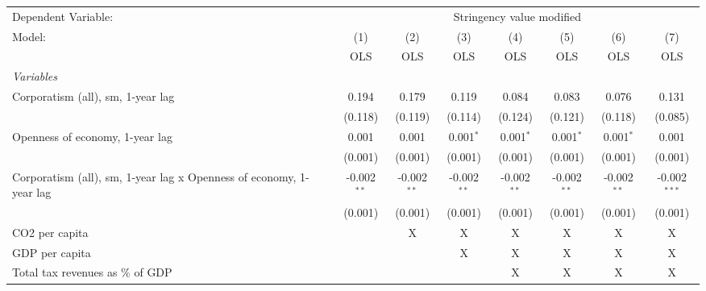 
\begingroup
\centering
\begin{tabular}{lccccccc}
   \toprule
   Dependent Variable: & \multicolumn{7}{c}{Stringency value modified}\\
   Model:                                                              & (1)           & (2)           & (3)           & (4)           & (5)           & (6)           & (7)\\  
                                                                       &  OLS          & OLS           & OLS           & OLS           & OLS           & OLS           & OLS\\  
   \midrule
   \emph{Variables}\\
   Corporatism (all), sm, 1-year lag                                   & 0.194         & 0.179         & 0.119         & 0.084         & 0.083         & 0.076         & 0.131\\   
                                                                       & (0.118)       & (0.119)       & (0.114)       & (0.124)       & (0.121)       & (0.118)       & (0.085)\\   
   Openness of economy, 1-year lag                                     & 0.001         & 0.001         & 0.001$^{*}$   & 0.001$^{*}$   & 0.001$^{*}$   & 0.001$^{*}$   & 0.001\\   
                                                                       & (0.001)       & (0.001)       & (0.001)       & (0.001)       & (0.001)       & (0.001)       & (0.001)\\   
   Corporatism (all), sm, 1-year lag x Openness of economy, 1-year lag & -0.002$^{**}$ & -0.002$^{**}$ & -0.002$^{**}$ & -0.002$^{**}$ & -0.002$^{**}$ & -0.002$^{**}$ & -0.002$^{***}$\\   
                                                                       & (0.001)       & (0.001)       & (0.001)       & (0.001)       & (0.001)       & (0.001)       & (0.001)\\   
   CO2 per capita                                                      &               & X             & X             & X             & X             & X             & X\\  
   GDP per capita                                                      &               &               & X             & X             & X             & X             & X\\  
   Total tax revenues as \% of GDP                                     &               &               &               & X             & X             & X             & X\\  

\end{tabular}
